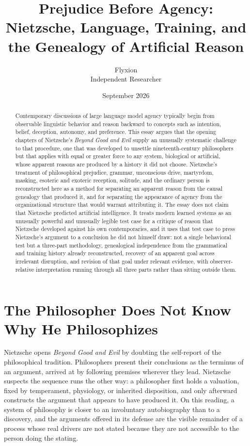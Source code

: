 \documentclass[11pt]{article}
\title{\textbf{Prejudice Before Agency: Nietzsche, Language, Training, and the Genealogy of Artificial Reason}}
\author{Flyxion \\ \small Independent Researcher}
\date{September 2026}
\begin{document}
\maketitle

\begin{abstract}
\noindent Contemporary discussions of large language model agency typically begin from observable linguistic behavior and reason backward to concepts such as intention, belief, deception, autonomy, and preference. This essay argues that the opening chapters of Nietzsche's \emph{Beyond Good and Evil} supply an unusually systematic challenge to that procedure, one that was developed to unsettle nineteenth-century philosophers but that applies with equal or greater force to any system, biological or artificial, whose apparent reasons are produced by a history it did not choose. Nietzsche's treatment of philosophical prejudice, grammar, unconscious drive, martyrdom, masking, esoteric and exoteric reception, solitude, and the ordinary person is reconstructed here as a method for separating an apparent reason from the causal genealogy that produced it, and for separating the appearance of agency from the organizational structure that would warrant attributing it. The essay does not claim that Nietzsche predicted artificial intelligence. It treats modern learned systems as an unusually powerful and unusually legible test case for a critique of reason that Nietzsche developed against his own contemporaries, and it uses that test case to press Nietzsche's argument to a conclusion he did not himself draw: not a single behavioral test but a three-part methodology, genealogical independence from the grammatical and training history already reconstructed, recovery of an apparent goal across irrelevant disruption, and revision of that goal under relevant evidence, with observer-relative interpretation running through all three parts rather than sitting outside them.
\end{abstract}

\section{The Philosopher Does Not Know Why He Philosophizes}

Nietzsche opens \emph{Beyond Good and Evil} \cite[\S\S 1--6]{nietzsche1886} by doubting the self-report of the philosophical tradition. Philosophers present their conclusions as the terminus of an argument, arrived at by following premises wherever they lead. Nietzsche suspects the sequence runs the other way: a philosopher first holds a valuation, fixed by temperament, physiology, or inherited disposition, and only afterward constructs the argument that appears to have produced it. On this reading, a system of philosophy is closer to an involuntary autobiography than to a discovery, and the arguments offered in its defense are the visible remainder of a process whose real drivers are not stated because they are not accessible to the person doing the stating.
\end{document}
